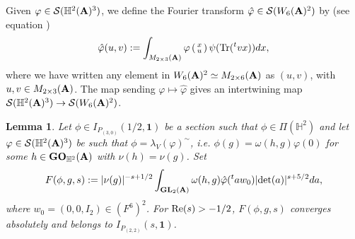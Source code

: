 \documentclass[11pt, reqno]{amsart}
\theoremstyle{plain}
\newtheorem{lemma}[theorem]{Lemma}
\theoremstyle{definition}
\theoremstyle{remark}
\theoremstyle{plain}
\def\A{{\bf A}}
\def\det{\mathrm{det}}
\def\GO{{\mathbf{GO}}}
\def\GL{\mathbf{GL}}
\begin{document}
Given $\varphi\in \mathcal{S}(\mathbb{H}^2(\A)^3)$, we define the Fourier transform $\hat{\varphi} \in \mathcal{S}(W_6(\A)^2)$ by (see equation \cite[(5.3.3)]{KudlaRallis}) 
\[\hat{\varphi}(u,v) := \int_{M_{2\times 3}(\A)}\varphi\left(\begin{smallmatrix}x\\u\end{smallmatrix}\right)\psi(\mathrm{Tr}({}^tv x))dx,\]
where we have written any element in $W_6(\A)^2 \simeq M_{2\times 6}(\A)$ as $(u,v)$, with $u,v \in M_{2\times 3}(\A)$. The map sending $\varphi\mapsto \hat{\varphi}$ gives an intertwining map $\mathcal{S}(\mathbb{H}^2(\A)^3)\to \mathcal{S}(W_6(\A)^2)$.
\begin{lemma}\label{lemma_constructing_sectionsforR}
    Let $\phi \in I_{P_{(3,0)}}\left(1/2,\mathbf{1}\right)$ be a section such that $ \phi \in \Pi(\mathbb{H}^2)$ and let $\varphi \in \mathcal{S}(\mathbb{H}^2(\A)^3)$ be such that $\phi  = \lambda_V(\varphi)^{\sim}$, \textit{i.e.}  $\phi(g) = \omega(h,g)\varphi(0)$ for some $h\in \GO_{\mathbb{H}^2}(\A)$ with $\nu(h) = \nu(g)$. Set 
     \[F(\phi,g,s):= | \nu(g)|^{-s+1/2}\int_{\GL_2(\A)}\omega(h,g)\hat{\varphi}
    ({}^{t}aw_0)|\det(a)|^{s+5/2} d a,\]
    where $w_0 = (0,0,I_2)\in (F^{6})^2$. For ${\rm Re}(s)>-1/2$,  $F(\phi,g,s)$ converges absolutely and belongs to $I_{P_{(2,2)}}(s, \mathbf{1})$. 
\end{lemma}
 
\end{document}

